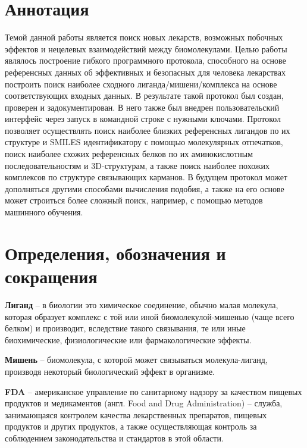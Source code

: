\documentclass[a4paper,14pt]{article}         %
\begin{document}
\section*{Аннотация}
	\Large

Темой данной работы является поиск новых лекарств, возможных побочных эффектов и нецелевых взаимодействий между биомолекулами. Целью работы являлось построение гибкого программного протокола, способного на основе референсных данных об эффективных и безопасных для человека лекарствах построить поиск наиболее сходного лиганда/мишени/комплекса на основе соответствующих входных данных. В результате такой протокол был создан, проверен и задокументирован. \color{orange}В него также был внедрен пользовательский интерфейс через запуск в командной строке с нужными ключами\color{black}. Протокол позволяет осуществлять поиск наиболее близких референсных лигандов по их структуре и SMILES идентификатору с помощью молекулярных отпечатков, поиск наиболее схожих референсных белков по их аминокислотным последовательностям и 3D-структурам, а также поиск наиболее похожих комплексов по структуре связывающих карманов. В будущем протокол может дополняться другими способами вычисления подобия, а также на его основе может строиться более сложный поиск, например, с помощью методов машинного обучения.

\setcounter{page}{2}            %

\newpage                        %
\tableofcontents                %

\newpage
\section*{Определения, обозначения и сокращения}

\textbf{Лиганд} -- в биологии это химическое соединение, обычно малая молекула, которая образует комплекс с той или иной биомолекулой-мишенью (чаще всего белком) и производит, вследствие такого связывания, те или иные биохимические, физиологические или фармакологические эффекты.

\textbf{Мишень} -- биомолекула, с которой может связываться молекула-лиганд, производя некоторый биологический эффект в организме.

\textbf{FDA} -- американское управление по санитарному надзору за качеством пищевых продуктов и медикаментов (англ. Food and Drug \linebreak Administration) -- служба, занимающаяся контролем качества лекарственных препаратов, пищевых продуктов и других продуктов, а также осуществляющая контроль за соблюдением законодательства и стандартов в этой области. 
\end{document}
